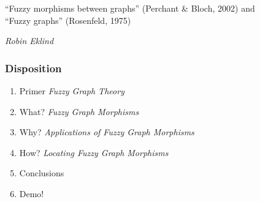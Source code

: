 \documentclass[aspectratio=1610]{beamer}
\begin{document}


\startpage

\begin{frame}
	\vspace{0.02\textheight}

	\begin{Large}
		``Fuzzy morphisms between graphs'' {\small (Perchant \& Bloch, 2002)} and \\ ``Fuzzy graphs'' {\small (Rosenfeld, 1975)}
	\end{Large}

	\vspace{0.1\textheight}

	\begin{small}
		\textit{Robin Eklind}
	\end{small}
\end{frame}


\normalpage

\begin{frame}
	\frametitle{Disposition}

	\begin{enumerate}
		\item Primer \textit{Fuzzy Graph Theory}
		\item What? \textit{Fuzzy Graph Morphisms}
		\item Why? \textit{Applications of Fuzzy Graph Morphisms}
		\item How? \textit{Locating Fuzzy Graph Morphisms}
		\item Conclusions
		\item Demo!
	\end{enumerate}
\end{frame}








\end{document}
